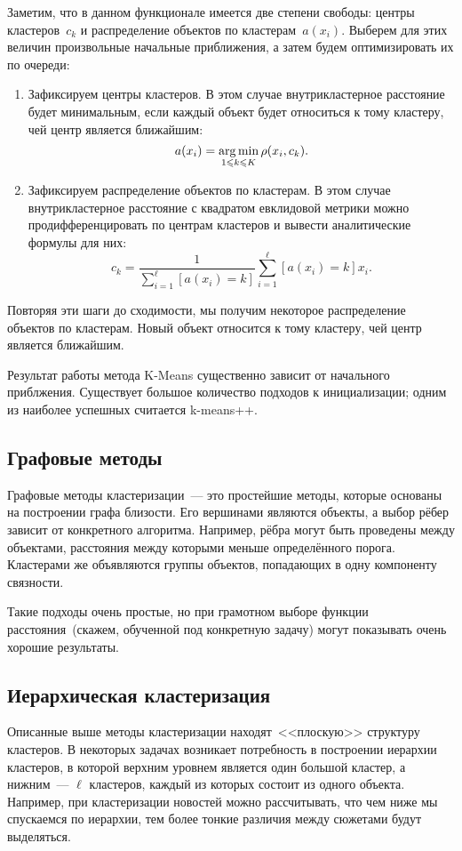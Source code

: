\documentclass[12pt,fleqn]{article}
\begin{document}
Заметим, что в данном функционале имеется две степени свободы:
центры кластеров~$c_k$ и распределение объектов по кластерам~$a(x_i)$.
Выберем для этих величин произвольные начальные приближения,
а затем будем оптимизировать их по очереди:
\begin{enumerate}
    \item Зафиксируем центры кластеров.
        В этом случае внутрикластерное расстояние будет минимальным,
        если каждый объект будет относиться к тому кластеру, чей центр является ближайшим:
        \[
            a(x_i)
            =
            \mathop{\rm arg\,min}\limits_{1 \leqslant k \leqslant K}
                \rho(x_i, c_k).
        \]
    \item Зафиксируем распределение объектов по кластерам.
        В этом случае внутрикластерное расстояние с квадратом евклидовой метрики можно продифференцировать
        по центрам кластеров и вывести аналитические формулы для них:
        \[
            c_k
            =
            \frac{1}{\sum_{i = 1}^{\ell} [a(x_i) = k]}
            \sum_{i = 1}^{\ell}
                [a(x_i) = k] x_i.
        \]
\end{enumerate}

Повторяя эти шаги до сходимости, мы получим некоторое распределение объектов по кластерам.
Новый объект относится к тому кластеру, чей центр является ближайшим.

Результат работы метода K-Means существенно зависит от начального приблжения.
Существует большое количество подходов к инициализации;
одним из наиболее успешных считается k-means++.

\subsection{Графовые методы}
Графовые методы кластеризации~--- это простейшие методы, которые основаны на построении
графа близости.
Его вершинами являются объекты, а выбор рёбер зависит от конкретного алгоритма.
Например, рёбра могут быть проведены между объектами,
расстояния между которыми меньше определённого порога.
Кластерами же объявляются группы объектов, попадающих в одну компоненту связности.

Такие подходы очень простые, но при грамотном выборе функции расстояния~(скажем,
обученной под конкретную задачу) могут показывать очень хорошие результаты.

\subsection{Иерархическая кластеризация}
Описанные выше методы кластеризации находят~<<плоскую>> структуру кластеров.
В некоторых задачах возникает потребность в построении иерархии кластеров,
в которой верхним уровнем является один большой кластер, а нижним~--- $\ell$ кластеров,
каждый из которых состоит из одного объекта.
Например, при кластеризации новостей можно рассчитывать, что чем ниже мы спускаемся
по иерархии, тем более тонкие различия между сюжетами будут выделяться.
\end{document}
